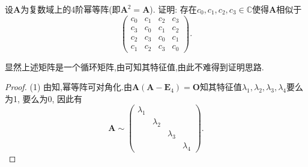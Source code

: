 \documentclass[../../main.tex]{subfiles}%
\begin{document}
\begin{example}
设$\boldsymbol{A}$为复数域上的4阶幂等阵(即$\boldsymbol{A}^2 = \boldsymbol{A}$). 证明: 存在$c_0,c_1,c_2,c_3 \in \mathbb{C}$使得$\boldsymbol{A}$相似于
$$
\begin{pmatrix}
c_0 & c_1 & c_2 & c_3 \\
c_3 & c_0 & c_1 & c_2 \\
c_2 & c_3 & c_0 & c_1 \\
c_1 & c_2 & c_3 & c_0
\end{pmatrix}.
$$
\end{example}
\begin{note}
显然上述矩阵是一个循环矩阵,由可知其特征值,由此不难得到证明思路.
\end{note}
\begin{proof}
(1) 由知,幂等阵可对角化.由$\boldsymbol{A}(\boldsymbol{A}-\boldsymbol{E}_4)=\boldsymbol{O}$知其特征值$\lambda_1,\lambda_2,\lambda_3,\lambda_4$要么为1, 要么为0, 因此有
$$
\boldsymbol{A} \sim \begin{pmatrix}
\lambda_1 & & & \\
& \lambda_2 & & \\
& & \lambda_3 & \\
& & & \lambda_4
\end{pmatrix}.
$$


\end{proof}
\end{document}

